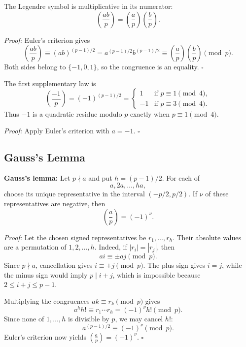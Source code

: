 \documentclass[a4paper,11pt,abstracton]{scrartcl}
\theoremstyle{dotlessP}
\theoremstyle{dotlessS}
\theoremstyle{remark}
\theoremstyle{definition}
\begin{document}
\begin{remark_box}
The Legendre symbol is multiplicative in its numerator:
\[
    \boxed{\left(\frac{ab}{p}\right)
      =\left(\frac ap\right)\left(\frac bp\right).}
\]
\end{remark_box}

\begin{claim_box}
\textit{Proof:}
Euler's criterion gives
\[
    \left(\frac{ab}{p}\right)
      \equiv (ab)^{(p-1)/2}
      =a^{(p-1)/2}b^{(p-1)/2}
      \equiv\left(\frac ap\right)\left(\frac bp\right)\pmod p.
\]
Both sides belong to $\{-1,0,1\}$, so the congruence is an equality.
\hfill$\square$
\end{claim_box}

\begin{remark_box}
The first supplementary law is
\[
    \boxed{\left(\frac{-1}{p}\right)=(-1)^{(p-1)/2}}
      =
      \begin{cases}
          1  & \text{if $p\equiv1\pmod4$},\\
         -1  & \text{if $p\equiv3\pmod4$}.
      \end{cases}
\]
Thus $-1$ is a quadratic residue modulo $p$ exactly when
$p\equiv1\pmod4$.
\end{remark_box}

\begin{claim_box}
\textit{Proof:}
Apply Euler's criterion with $a=-1$.
\hfill$\square$
\end{claim_box}

\subsection{Gauss's Lemma}

\begin{remark_box}
\textbf{Gauss's lemma:}
Let $p\nmid a$ and put $h=(p-1)/2$. For each of
\[
    a,2a,\ldots,ha,
\]
choose its unique representative in the interval $(-p/2,p/2)$.
If $\nu$ of these representatives are negative, then
\[
    \boxed{\left(\frac ap\right)=(-1)^\nu.}
\]
\end{remark_box}

\begin{claim_box}
\textit{Proof:}
Let the chosen signed representatives be $r_1,\ldots,r_h$.
Their absolute values are a permutation of $1,2,\ldots,h$.
Indeed, if $|r_i|=|r_j|$, then
\[
    ai\equiv\pm aj\pmod p.
\]
Since $p\nmid a$, cancellation gives $i\equiv\pm j\pmod p$.
The plus sign gives $i=j$, while the minus sign would imply
$p\mid i+j$, which is impossible because $2\leq i+j\leq p-1$.

Multiplying the congruences $ak\equiv r_k\pmod p$ gives
\[
    a^h h!\equiv r_1\cdots r_h
      =(-1)^\nu h!\pmod p.
\]
Since none of $1,\ldots,h$ is divisible by $p$, we may cancel $h!$:
\[
    a^{(p-1)/2}\equiv(-1)^\nu\pmod p.
\]
Euler's criterion now yields
$\left(\frac ap\right)=(-1)^\nu$.
\hfill$\square$
\end{claim_box}
\end{document}
